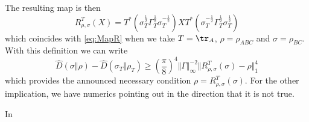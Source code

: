 The resulting map is then
\begin{equation}
    R_{\rho,\sigma}^T(X)=T^*\left(\sigma_T^{\frac{1}{2}}\Gamma_T^{\frac{1}{2}}\sigma_T^{-\frac{1}{2}}\right)XT^*\left(\sigma_T^{-\frac{1}{2}}\Gamma_T^{\frac{1}{2}}\sigma_T^{\frac{1}{2}}\right)
\end{equation}
which coincides with \eqref{eq:MapR} when we take $T=\tr_A$, $\rho=\rho_{ABC}$ and $\sigma=\rho_{BC}$. With this definition we can write
\begin{equation}
    \hat{D}(\sigma \Vert \rho)-\hat{D}(\sigma_T \Vert \rho_T)\geq \left( \frac{\pi}{8} \right)^4 \Vert \Gamma \Vert_{\infty}^{-2} \Vert R_{\rho,\sigma}^T(\sigma)-\rho \Vert_1^4
\end{equation}
which provides the announced necessary condition $\rho=R_{\rho,\sigma}^T(\sigma)$. For the other implication, we have numerics pointing out in the direction that it is not true.


In \cite{gondolf2024conditional} 

